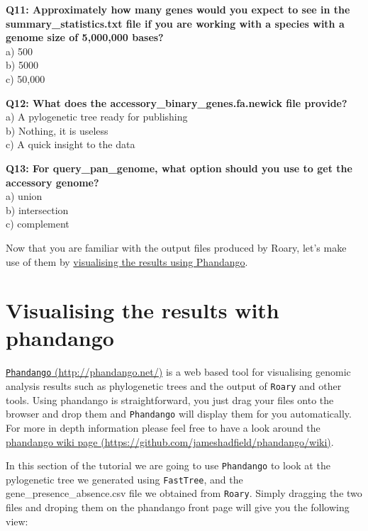 \documentclass[11pt]{article}
\begin{document}
\textbf{Q11: Approximately how many genes would you expect to see in the
summary\_statistics.txt file if you are working with a species with a
genome size of 5,000,000 bases?}\\
a) 500\\
b) 5000\\
c) 50,000

\textbf{Q12: What does the accessory\_binary\_genes.fa.newick file
provide?}\\
a) A pylogenetic tree ready for publishing\\
b) Nothing, it is useless\\
c) A quick insight to the data

\textbf{Q13: For query\_pan\_genome, what option should you use to get
the accessory genome?}\\
a) union\\
b) intersection\\
c) complement

Now that you are familiar with the output files produced by Roary, let's
make use of them by \href{phandango.ipynb}{visualising the results using
Phandango}.





\newpage





    \hypertarget{visualising-the-results-with-phandango}{%
\section{Visualising the results with
phandango}\label{visualising-the-results-with-phandango}}

\href{http://phandango.net/}{\texttt{Phandango} (http://phandango.net/)}
is a web based tool for visualising genomic analysis results such as
phylogenetic trees and the output of \texttt{Roary} and other tools.
Using phandango is straightforward, you just drag your files onto the
browser and drop them and \texttt{Phandango} will display them for you
automatically. For more in depth information please feel free to have a
look around the
\href{https://github.com/jameshadfield/phandango/wiki}{phandango wiki
page (https://github.com/jameshadfield/phandango/wiki)}.

In this section of the tutorial we are going to use \texttt{Phandango}
to look at the pylogenetic tree we generated using \texttt{FastTree},
and the gene\_presence\_absence.csv file we obtained from
\texttt{Roary}. Simply dragging the two files and droping them on the
phandango front page will give you the following view:
\end{document}
